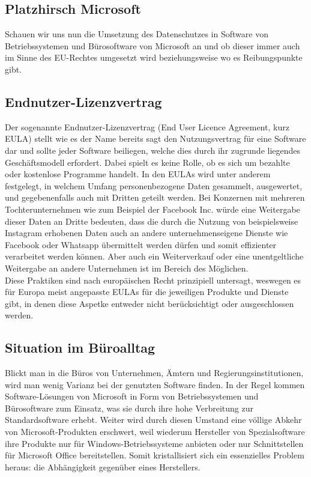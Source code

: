 \subsection{Platzhirsch Microsoft}
Schauen wir uns nun die Umsetzung des Datenschutzes in Software von Betriebssystemen und Bürosoftware von Microsoft an und ob dieser immer auch im Sinne des EU-Rechtes umgesetzt wird beziehungsweise wo es Reibungspunkte gibt.

\subsection{Endnutzer-Lizenzvertrag}
Der sogenannte Endnutzer-Lizenzvertrag (\glqq End User Licence Agreement\grqq{}, kurz EULA) stellt wie es der Name bereits sagt den Nutzungsvertrag für eine Software dar und sollte jeder Software beiliegen, welche dies durch ihr zugrunde liegendes Geschäftsmodell erfordert. Dabei spielt es keine Rolle, ob es sich um bezahlte oder kostenlose Programme handelt. In den \mbox{EULAs} wird unter anderem festgelegt, in welchem Umfang personenbezogene Daten gesammelt, ausgewertet, und gegebenenfalls auch mit Dritten geteilt werden. Bei Konzernen mit mehreren Tochterunternehmen wie zum Beispiel der Facebook Inc. würde eine Weitergabe dieser Daten an Dritte bedeuten, dass die durch die Nutzung von beispielsweise Instagram erhobenen Daten auch an andere unternehmenseigene Dienste wie Facebook oder Whatsapp übermittelt werden dürfen und somit effizienter verarbeitet werden können. Aber auch ein Weiterverkauf oder eine unentgeltliche Weitergabe an andere Unternehmen ist im Bereich des Möglichen.\\
Diese Praktiken sind nach europäischen Recht prinzipiell untersagt, weswegen es für Europa meist angepasste EULAs für die jeweiligen Produkte und Dienste gibt, in denen diese Aspetke entweder nicht berücksichtigt oder ausgeschlossen werden.

\subsection{Situation im Büroalltag}
Blickt man in die Büros von Unternehmen, Ämtern und Regierungsinstitutionen, wird man wenig Varianz bei der genutzten Software finden. In der Regel kommen Software-Lösungen von Microsoft in Form von Betriebssystemen und Bürosoftware zum Einsatz, was sie durch ihre hohe Verbreitung zur Standardsoftware erhebt. Weiter wird durch diesen Umstand eine völlige Abkehr von Microsoft-Produkten erschwert, weil wiederum Hersteller von Spezialsoftware ihre Produkte nur für Windows-Betriebssysteme anbieten oder nur Schnittstellen für Microsoft Office bereitstellen. Somit kristallisiert sich ein essenzielles Problem heraus: die Abhängigkeit gegenüber eines Herstellers.


